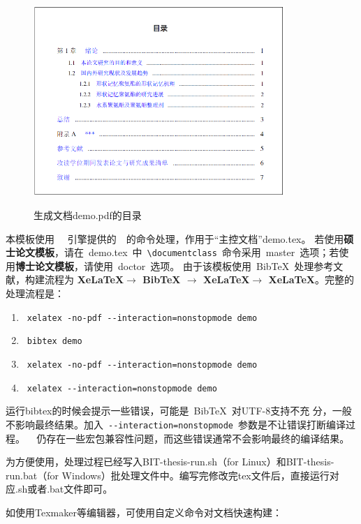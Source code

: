 \begin{figure}[!htp]
  \centering
  {\includegraphics[width=0.85\textwidth]{figures/demo_context}}
  \caption{生成文档demo.pdf的目录}
  \label{fig:demo_context}
\end{figure}

本模板使用~\XeTeX~ 引擎提供的~\XeLaTeX~的命令处理，作用于“主控文档”demo.tex。
若使用\textbf{硕士论文模板}，请在~demo.tex~中~\verb|\documentclass|~命令采用~master~选项；若使用\textbf{博士论文模板}，请使用~doctor~选项。
由于该模板使用~{{\sc Bib}\TeX}~处理参考文献，构建流程为 \textbf{XeLaTeX$\rightarrow$ BibTeX $\rightarrow$ XeLaTeX$\rightarrow$ XeLaTeX}。完整的处理流程是：

{\color{blue}
\begin{enumerate}
\item[] ~\verb|xelatex -no-pdf --interaction=nonstopmode demo|
\item[] ~\verb|bibtex demo| 
\item[] ~\verb|xelatex -no-pdf --interaction=nonstopmode demo|
\item[] ~\verb|xelatex --interaction=nonstopmode demo|
\end{enumerate}}

运行bibtex的时候会提示一些错误，可能是~{{\sc Bib}\TeX}~对UTF-8支持不充
分，一般不影响最终结果。加入~\verb|--interaction=nonstopmode|~参数是不让错误打断编译过程。
\XeTeX~ 仍存在一些宏包兼容性问题，而这些错误通常不会影响最终的编译结果。

为方便使用，处理过程已经写入BIT-thesis-run.sh（for Linux）和BIT-thesis-run.bat（for Windows）批处理文件中。编写完修改完tex文件后，直接运行对应.sh或者.bat文件即可。

如使用Texmaker等编辑器，可使用自定义命令对文档快速构建：

